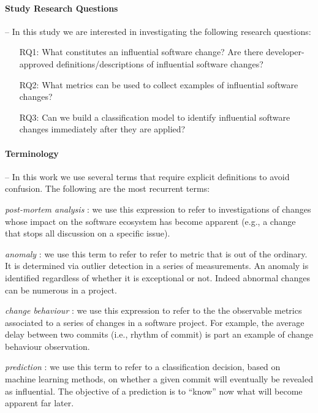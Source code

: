 \paragraph*{\bf Study Research Questions} -- In this study we are interested in investigating the following research questions:
\begin{itemize}
\itemsep0em
	\item[RQ1:] What constitutes an influential software change? Are there developer-approved definitions/descriptions of influential software changes?
	\item[RQ2:] What metrics can be used to collect examples of influential software changes?
	\item[RQ3:] Can we build a classification model to identify influential software changes immediately after they are applied?
\end{itemize}


\paragraph*{\bf Terminology} -- In this work we use several terms that require explicit definitions to avoid confusion. The following are the most recurrent terms:

{\em post-mortem analysis} : we use this expression to refer to investigations of changes whose impact on the software ecosystem has become apparent (e.g., a change that stops all discussion on a specific issue).

{\em anomaly} : we use this term to refer to refer to metric that is out of the ordinary. It is determined via outlier detection in a series of measurements. An anomaly is identified regardless of whether it is exceptional or not. Indeed abnormal changes can be numerous in a project.

{\em change behaviour} : we use this expression to refer to the the observable metrics associated to a series of changes in a software project. For example, the average delay between two commits (i.e., rhythm of commit) is part an example of change behaviour observation.

{\em prediction} : we use this term to refer to a classification decision, based on machine learning methods, on whether a given commit will eventually be revealed as influential. The objective of a prediction is to ``know'' now what will become apparent far later.
 

